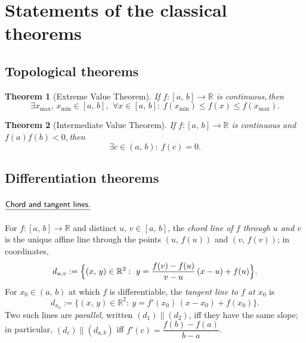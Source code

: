 \documentclass[11pt,reqno]{amsart}
\providecommand{\R}{\mathbb{R}}
\newcommand{\comma}{,\,\allowbreak}
\theoremstyle{redplain}
\newtheorem{theorem}{Theorem}
\begin{document}
\section{Statements of the classical theorems}

\subsection{Topological theorems}

\begin{theorem}[Extreme Value Theorem]
	\label{thm:evt}
	If $f:[a\comma b]\to\R$ is continuous\comma then
	\begin{equation}\label{eq:evt}
	\exists x_{\max}\comma x_{\min}\in[a\comma b]\comma\ \forall x\in[a\comma b]:\ f(x_{\min})\le f(x)\le f(x_{\max}).
	\end{equation}
\end{theorem}

\begin{theorem}[Intermediate Value Theorem]
	\label{thm:ivt}
	If $f:[a\comma b]\to\R$ is continuous and $f(a)f(b)<0$\comma then
	\begin{equation}\label{eq:ivt}
	\exists c\in(a\comma b):\ f(c)=0.
	\end{equation}
\end{theorem}

\subsection{Differentiation theorems}

\paragraph{$\textsf{\underline{Chord and tangent lines.}}$}\text{\ }
For $f:[a\comma b]\to\R$ and distinct $u\comma v\in[a\comma b]$, the \emph{chord line of $f$ through $u$ and $v$} is the unique affine line through the points $(u\comma f(u))$ and $(v\comma f(v))$; in coordinates,
\begin{equation}\label{eq:chord-line}
	d_{u,v}:=\Bigl\{(x\comma y)\in\R^{2}:\ y=\frac{f(v)-f(u)}{v-u}\,(x-u)+f(u)\Bigr\}.
\end{equation}
For $x_0\in(a\comma b)$ at which $f$ is differentiable, the \emph{tangent line to $f$ at $x_0$} is
\begin{equation}\label{eq:tangent-line}
	d_{x_0}:=\bigl\{(x\comma y)\in\R^{2}:\ y=f'(x_0)\,(x-x_0)+f(x_0)\bigr\}.
\end{equation}
Two such lines are \emph{parallel}, written $(d_1)\parallel (d_2)$, iff they have the same slope; in particular, $(d_c)\parallel (d_{a,b})$ iff $f'(c)=\dfrac{f(b)-f(a)}{b-a}$.
\end{document}
